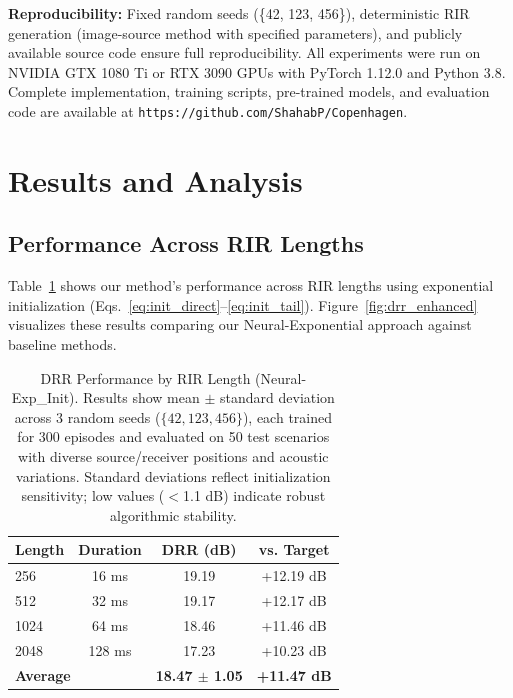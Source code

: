 \documentclass[12pt,a4paper]{article}
\begin{document}
\textbf{Reproducibility:} Fixed random seeds (\{42, 123, 456\}), deterministic RIR generation (image-source method with specified parameters), and publicly available source code ensure full reproducibility. All experiments were run on NVIDIA GTX 1080 Ti or RTX 3090 GPUs with PyTorch 1.12.0 and Python 3.8. Complete implementation, training scripts, pre-trained models, and evaluation code are available at \texttt{https://github.com/ShahabP/Copenhagen}.

\section{Results and Analysis}

\subsection{Performance Across RIR Lengths}

Table~\ref{tab:rir_results} shows our method's performance across RIR lengths using exponential initialization (Eqs.~\eqref{eq:init_direct}--\eqref{eq:init_tail}). Figure~\ref{fig:drr_enhanced} visualizes these results comparing our Neural-Exponential approach against baseline methods.

\begin{table}[t]
\centering
\caption{DRR Performance by RIR Length (Neural-Exp\_Init). Results show mean $\pm$ standard deviation across 3 random seeds ($\{42, 123, 456\}$), each trained for 300 episodes and evaluated on 50 test scenarios with diverse source/receiver positions and acoustic variations. Standard deviations reflect initialization sensitivity; low values ($<$1.1 dB) indicate robust algorithmic stability.}
\label{tab:rir_results}
\small
\begin{tabular}{@{}lccc@{}}
\toprule
\textbf{Length} & \textbf{Duration} & \textbf{DRR (dB)} & \textbf{vs. Target} \\
\midrule
256 & 16 ms & 19.19 & +12.19 dB \\
512 & 32 ms & 19.17 & +12.17 dB \\
1024 & 64 ms & 18.46 & +11.46 dB \\
2048 & 128 ms & 17.23 & +10.23 dB \\
\midrule
\multicolumn{2}{l}{\textbf{Average}} & \textbf{18.47 $\pm$ 1.05} & \textbf{+11.47 dB} \\
\bottomrule
\end{tabular}
\end{table}
\end{document}
